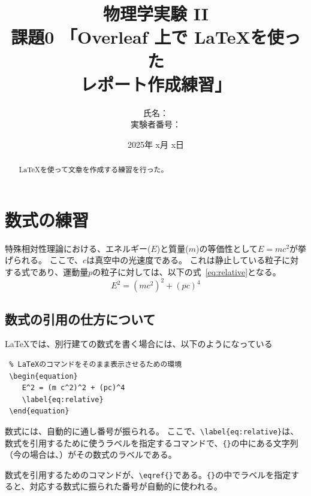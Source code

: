 \documentclass[uplatex,dvipdfmx,a4j,12pt]{jsarticle}
\title{
  物理学実験 II\\    %
  課題0 「Overleaf 上で \LaTeX を使った \\レポート作成練習」
  }
\author{
  氏名： \\
  実験者番号： %
  }
\date{2025年 x月 x日}  %
\begin{document}
\maketitle


%
\begin{abstract}
    \LaTeX を使って文章を作成する練習を行った。
\end{abstract}


\section{数式の練習}


特殊相対性理論における、エネルギー($E$)と質量($m$)の等価性として$E=mc^2$が挙げられる。
ここで、$c$は真空中の光速度である。
これは静止している粒子に対する式であり、運動量$p$の粒子に対しては、以下の式~\eqref{eq:relative}となる。 
\begin{equation}
%
    E^2 = (m c^2)^2 + (pc)^4
    \label{eq:relative}
\end{equation}

\subsection{数式の引用の仕方について}
\LaTeX では、別行建ての数式を書く場合には、以下のようになっている

\begin{verbatim} % LaTeXのコマンドをそのまま表示させるための環境
 \begin{equation}
    E^2 = (m c^2)^2 + (pc)^4
    \label{eq:relative}
 \end{equation}
\end{verbatim}
数式には、自動的に通し番号が振られる。
ここで、\verb|\label{eq:relative}|は、数式を引用するために使うラベルを指定するコマンドで、\verb|{}|の中にある文字列（今の場合は、）がその数式のラベルである。

数式を引用するためのコマンドが、\verb|\eqref{}|である。\verb|{}|の中でラベルを指定すると、対応する数式に振られた番号が自動的に使われる。
\end{document}
